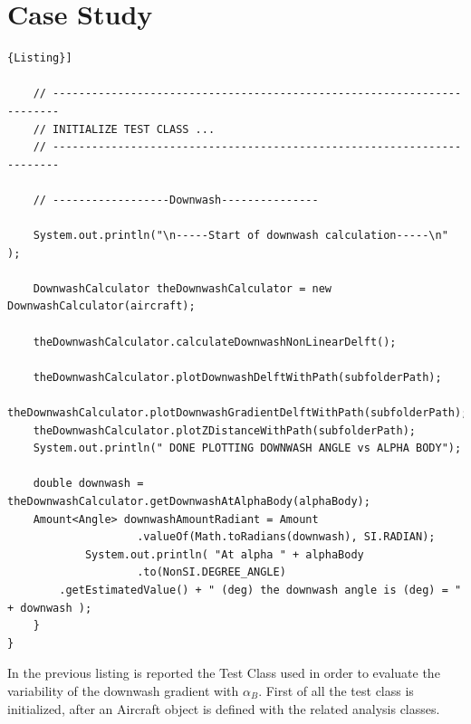 \section{Case Study}


\begin{lstlisting}[frame=rbl,caption={{\footnotesize Downwash Test Class}},label= [style=\bfseries]{Listing}]

	// -----------------------------------------------------------------------
	// INITIALIZE TEST CLASS ...
	// -----------------------------------------------------------------------

	// ------------------Downwash---------------

	System.out.println("\n-----Start of downwash calculation-----\n" );

	DownwashCalculator theDownwashCalculator = new DownwashCalculator(aircraft);

	theDownwashCalculator.calculateDownwashNonLinearDelft();

	theDownwashCalculator.plotDownwashDelftWithPath(subfolderPath);
	theDownwashCalculator.plotDownwashGradientDelftWithPath(subfolderPath);
	theDownwashCalculator.plotZDistanceWithPath(subfolderPath);
	System.out.println(" DONE PLOTTING DOWNWASH ANGLE vs ALPHA BODY");

	double downwash = theDownwashCalculator.getDownwashAtAlphaBody(alphaBody);
	Amount<Angle> downwashAmountRadiant = Amount
					.valueOf(Math.toRadians(downwash), SI.RADIAN);
			System.out.println( "At alpha " + alphaBody
					.to(NonSI.DEGREE_ANGLE)
		.getEstimatedValue() + " (deg) the downwash angle is (deg) = " + downwash );
	}
}
\end{lstlisting}

In the previous listing is reported the Test Class used in order to evaluate the variability of the downwash gradient with $\alpha_B$. First of all the test class is initialized, after an Aircraft object is defined with the related analysis classes.


